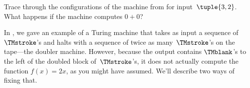 \documentclass[../../../include/open-logic-section]{subfiles}
\begin{document}
\begin{prob}
Trace through the configurations of the machine from
 for input~$\tuple{3,2}$. What happens
if the machine computes $0+0$?
\end{prob}

\begin{explain}
In , we gave an example of a Turing machine
that takes as input a sequence of~$\TMstroke$'s and halts with a sequence
of twice as many~$\TMstroke$'s on the tape---the doubler machine.
However, because the output contains $\TMblank$'s to the left of the
doubled block of~$\TMstroke$'s, it does not actually compute the
function $f(x) = 2x$, as you might have assumed. We'll describe two
ways of fixing that.
\end{explain}
\end{document}

